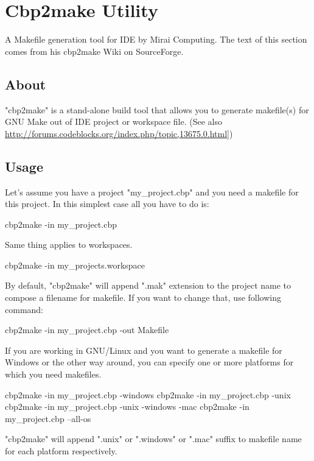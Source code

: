 \section{Cbp2make Utility}\label{sec:cbp2make}

A Makefile generation tool for \codeblocks IDE by Mirai Computing. The text of this section comes from his cbp2make Wiki on SourceForge.

\subsection{About}

"cbp2make" is a stand-alone build tool that allows you to generate makefile(s) for GNU Make out of \codeblocks IDE project or workspace file. (See also \url{http://forums.codeblocks.org/index.php/topic,13675.0.html]})

\subsection{Usage}

Let's assume you have a project "my\_project.cbp" and you need a makefile for this project. In this simplest case all you have to do is:
\begin{code}
cbp2make -in my_project.cbp
\end{code}

Same thing applies to workspaces.
\begin{code}
cbp2make -in my_projects.workspace
\end{code}

By default, "cbp2make" will append ".mak" extension to the project name to compose a filename for makefile.
If you want to change that, use following command:

\begin{code}
cbp2make -in my_project.cbp -out Makefile
\end{code}

If you are working in GNU/Linux and you want to generate a makefile for Windows or the other way around, you can specify one or more platforms for which you need makefiles.

\begin{code}
cbp2make -in my_project.cbp -windows
cbp2make -in my_project.cbp -unix
cbp2make -in my_project.cbp -unix -windows -mac
cbp2make -in my_project.cbp --all-os
\end{code}
"cbp2make" will append ".unix" or ".windows" or ".mac" suffix to makefile name for each platform respectively.

